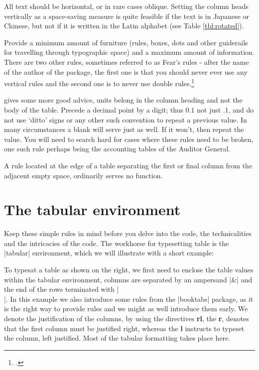 All text should be horizontal, or in rare cases oblique. Setting the column heads vertically 
as a space-saving measure is quite feasible if the text is in Japanese or Chinese, 
but not if it is written in the Latin alphabet (see Table \ref{tbl:rotated}).


Provide a minimum amount of furniture (rules, boxes, dots and other guiderails for travelling through typographic space) and a maximum amount of information. There are two other rules, sometimes referred to as Fear's rules - after the name of the author of the  package, the first one is that you should never ever use any vertical rules and the second one is to never use double rules.\footcite{booktabs}


\citeauthor{booktabs} gives some more good advice,   units belong in the column heading and not the body of the table. Precede a decimal point by a digit; thus 0.1 not just .1, and do not use `ditto' signs or any other such convention to repeat a previous value. In many circumstances a blank will serve just as well. If it won't,
then repeat the value. You will need to search hard for cases where these rules need to be broken, one such rule perhaps being the accounting tables of the Auditor General. 

A rule located at the edge of a table separating the first or final column from the adjacent empty space, ordinarily serves no function.


\section{The tabular environment}

Keep these simple rules in mind before you delve into the code, the technicalities and the intricacies of the code. The \latex workhorse for typesetting table is the |tabular| environment, which we will illustrate with a short example:

To typesat a  table as shown on the right, we first need to enclose the table values within the tabular environment, columns are separated by an ampersand |&| and the end of the rows terminated with |\\|.
In this example we also introduce some rules from the |booktabs| package, as it is the right way to provide rules and we might as well introduce them early. We denote the justification of the columns, by using the directives \textbf{rl}, the \textbf{r}, denotes that the first column must be justified right, whereas the \textbf{l} instructs \latex to typeset the column, left justified. Most of the tabular formatting takes place here.

